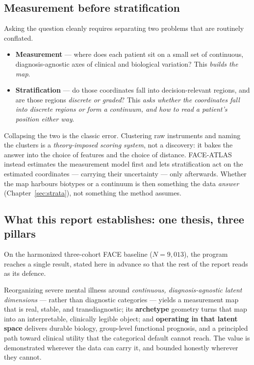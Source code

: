\subsection{Measurement before stratification}
Asking the question cleanly requires separating two problems that are routinely conflated.
\begin{itemize}\setlength{\itemsep}{1pt}
  \item \textbf{Measurement} --- where does each patient sit on a small set of continuous,
  diagnosis-agnostic axes of clinical and biological variation? This \emph{builds the map}.
  \item \textbf{Stratification} --- do those coordinates fall into decision-relevant regions, and are those
  regions \emph{discrete or graded}? This \emph{asks whether the coordinates fall into discrete regions or form a continuum, and how to read a patient's position either way}.
\end{itemize}
Collapsing the two is the classic error. Clustering raw instruments and naming the clusters is a
\emph{theory-imposed scoring system}, not a discovery: it bakes the answer into the choice of features and the
choice of distance. FACE-ATLAS instead estimates the measurement model first and lets stratification act on
the estimated coordinates --- carrying their uncertainty --- only afterwards. Whether the map harbours
biotypes or a continuum is then something the data \emph{answer} (Chapter~\ref{sec:strata}), not something the
method assumes.

\subsection{What this report establishes: one thesis, three pillars}
On the harmonized three-cohort FACE baseline ($N=9{,}013$), the program reaches a single result, stated here in
advance so that the rest of the report reads as its defence.

\begin{thesisbox}
Reorganizing severe mental illness around \emph{continuous, diagnosis-agnostic latent dimensions} --- rather
than diagnostic categories --- yields a measurement map that is real, stable, and transdiagnostic; its
\textbf{archetype} geometry turns that map into an interpretable, clinically legible object; and
\textbf{operating in that latent space} delivers durable biology, group-level functional prognosis, and a
principled path toward clinical utility that the categorical default cannot reach. The value is demonstrated
wherever the data can carry it, and bounded honestly wherever they cannot.
\end{thesisbox}

